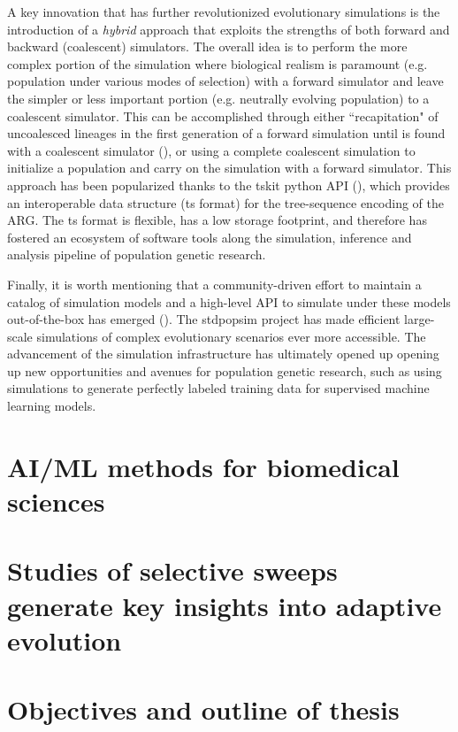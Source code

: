 A key innovation that has further revolutionized evolutionary simulations is the introduction of a \textit{hybrid} approach that exploits the strengths of both forward and backward (coalescent) simulators. The overall idea is to perform the more complex portion of the simulation where biological realism is paramount (e.g. population under various modes of selection) with a forward simulator and leave the simpler or less important portion (e.g. neutrally evolving population) to a coalescent simulator. This can be accomplished through either ``recapitation" of uncoalesced lineages in the first generation of a forward simulation until  is found with a coalescent simulator (\cite{haller_slim_2019}), or using a complete coalescent simulation to initialize a population and carry on the simulation with a forward simulator. This approach has been popularized thanks to the tskit python API (\cite{kelleher2016efficient,kelleher2018efficient}), which provides an interoperable data structure (ts format) for the tree-sequence encoding of the \ac{ARG}. The ts format is flexible, has a low storage footprint, and therefore has fostered an ecosystem of software tools along the simulation, inference and analysis pipeline of population genetic research.

Finally, it is worth mentioning that a community-driven effort to maintain a catalog of simulation models and a high-level API to simulate under these models out-of-the-box has emerged (\cite{adrion_community-maintained_2020,lauterbur_expanding_2022}). The stdpopsim project has made efficient large-scale simulations of complex evolutionary scenarios ever more accessible. The advancement of the simulation infrastructure has ultimately opened up opening up new opportunities and avenues for population genetic research, such as using simulations to generate perfectly labeled training data for supervised machine learning models.

\section{\ac{AI}/\ac{ML} methods for biomedical sciences}

\section{Studies of selective sweeps generate key insights into adaptive evolution}

\section{Objectives and outline of thesis}
